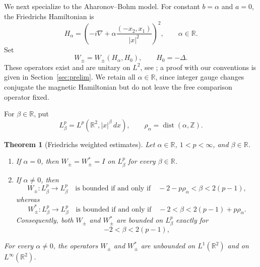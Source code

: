 \documentclass[11pt,a4paper,reqno,backref=page]{amsart}
\newcommand{\R}{\mathbb R}
\newcommand{\Z}{\mathbb Z}
\numberwithin{equation}{section}
\newtheorem{theorem}{Theorem}[section]
\theoremstyle{definition}
\theoremstyle{remark}
\begin{document}
We next specialize to the Aharonov--Bohm model.
For constant $b=\alpha$ and $a=0$, the Friedrichs
Hamiltonian is
\begin{equation}\label{eq:Halpha}
  H_\alpha
  =\left(-i\nabla+\alpha\frac{(-x_2,x_1)}{|x|^2}\right)^2,
  \qquad \alpha\in\R.
\end{equation}
Set
\begin{equation}\label{eq:waveop}
  W_\pm=W_\pm(H_\alpha,H_0),\qquad H_0=-\Delta.
\end{equation}
These operators exist and are unitary on $L^2$, see
\cite{Ruijsenaars1983}; a proof with our conventions is given
in Section~\ref{sec:prelim}. We retain all $\alpha\in \mathbb{R}$,
since integer gauge changes conjugate the magnetic
Hamiltonian but do not leave the free comparison operator
fixed.

For $\beta\in\R$, put
\begin{equation*}
  L^p_\beta=L^p(\R^2,|x|^\beta\,dx),\qquad
  \rho_\alpha=\operatorname{dist}(\alpha,\Z).
\end{equation*}

\begin{theorem}[Friedrichs weighted estimates]
  \label{thm:weighted}
  Let $\alpha\in\R$, $1<p<\infty$, and $\beta\in\R$.
  \begin{enumerate}
  \item[(i)] If $\alpha=0$, then $W_\pm=W_\pm^*=I$ on $L^p_\beta$
             for every $\beta\in\R$.
  \item[(ii)] If $\alpha\ne0$, then
  \begin{equation}\label{eq:weighted-W-range}
    W_\pm:L^p_\beta\longrightarrow L^p_\beta
    \quad\text{is bounded if and only if}\quad
    -2-p\rho_\alpha<\beta<2(p-1),
  \end{equation}
  whereas
  \begin{equation}\label{eq:weighted-Wstar-range}
    W_\pm^*:L^p_\beta\longrightarrow L^p_\beta
    \quad\text{is bounded if and only if}\quad
    -2<\beta<2(p-1)+p\rho_\alpha.
  \end{equation}
Consequently, both $W_\pm$ and $W_\pm^*$ are bounded on
  $L^p_\beta$ exactly for
  \begin{equation}\label{eq:weighted-similarity-range}
    -2<\beta<2(p-1),
  \end{equation}
  \end{enumerate}
  For every $\alpha\ne0$, the operators $W_\pm$ and $W_\pm^*$
  are unbounded on $L^1(\R^2)$ and on $L^\infty(\R^2)$.
\end{theorem}
\end{document}
